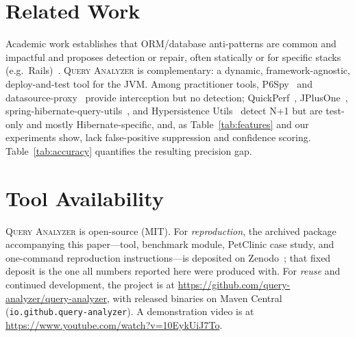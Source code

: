 \documentclass[sigplan,screen]{acmart}
\newcommand{\tool}{\textsc{Query Analyzer}}
\newcommand{\code}[1]{\texttt{\small #1}}
\begin{document}
\section{Related Work}
Academic work establishes that ORM/database anti-patterns are common and
impactful and proposes detection or repair, often statically or for specific
stacks (e.g.\ Rails)~\cite{chen2014orm, yang2018webapps, yang2019powerstation}.
\tool{} is complementary: a dynamic, framework-agnostic, deploy-and-test tool for
the JVM. Among practitioner tools, P6Spy~\cite{p6spy} and
datasource-proxy~\cite{datasourceproxy} provide interception but no detection;
QuickPerf~\cite{quickperf}, JPlusOne~\cite{jplusone},
spring-hibernate-query-utils~\cite{springhibernatequeryutils}, and Hypersistence
Utils~\cite{hypersistenceutils} detect N+1 but are test-only and mostly
Hibernate-specific, and, as Table~\ref{tab:features} and our experiments
show, lack false-positive suppression and confidence scoring.
Table~\ref{tab:accuracy} quantifies the resulting precision gap.

\section{Tool Availability}
\tool{} is open-source (MIT). For \emph{reproduction}, the archived
package accompanying this paper---tool, benchmark module, PetClinic case
study, and one-command reproduction instructions---is deposited on
Zenodo~\cite{queryanalyzer-artifact}; that fixed deposit is the one all
numbers reported here were produced with. For \emph{reuse} and
continued development, the project is at
\url{https://github.com/query-analyzer/query-analyzer}, with released
binaries on Maven Central (\code{io.github.query-analyzer}). A
demonstration video is at
\url{https://www.youtube.com/watch?v=10EykUiJ7To}.

\newpage


\end{document}
